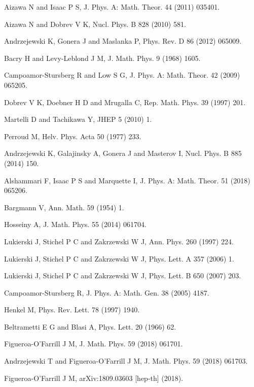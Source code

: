\documentclass[12pt]{article}
\begin{document}
\begin{thebibliography}{}
Aizawa N and Isaac P S, J. Phys. A: Math. Theor. 44 (2011) 035401.

Aizawa N and Dobrev V K, Nucl. Phys. B 828 (2010) 581.

Andrzejewski K, Gonera J and Maslanka P, Phys. Rev. D 86 (2012) 065009.

Bacry H and Levy-Leblond J M, J. Math. Phys. 9 (1968) 1605.

Campoamor-Stursberg R and Low S G, J.  Phys. A: Math. Theor. 42 (2009) 065205.

Dobrev V K, Doebner H D and Mrugalla C, Rep. Math. Phys. 39 (1997) 201.

Martelli D and Tachikawa Y, JHEP 5 (2010) 1.

Perroud M, Helv. Phys. Acta 50 (1977) 233. 

Andrzejewski K, Galajinsky A, Gonera J and Masterov I, Nucl. Phys. B 885 (2014) 150.

Alshammari F, Isaac P S and Marquette I, J. Phys. A: Math. Theor. 51 (2018) 065206.

Bargmann V, Ann. Math. 59 (1954) 1.

Hosseiny A, J. Math. Phys. 55 (2014) 061704.

Lukierski J, Stichel P C and Zakrzewski W J, Ann. Phys. 260 (1997) 224.

Lukierski J, Stichel P C and Zakrzewski W J, Phys. Lett. A 357 (2006) 1.

Lukierski J, Stichel P C and Zakrzewski W J, Phys. Lett. B 650 (2007) 203.

Campoamor-Stursberg R, J. Phys. A: Math. Gen. 38 (2005) 4187.

Henkel M, Phys.  Rev. Lett. 78 (1997) 1940.

Beltrametti E G and Blasi A, Phys. Lett. 20 (1966) 62.

Figueroa-O'Farrill J M, J. Math. Phys. 59 (2018) 061701.

Andrzejewski T and Figueroa-O'Farrill J M, J. Math. Phys. 59 (2018) 061703.

Figueroa-O'Farrill J M, arXiv:1809.03603 [hep-th] (2018).

\end{thebibliography}
\end{document}
